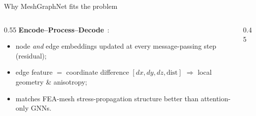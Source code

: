 \documentclass[aspectratio=169,10pt]{beamer}
\begin{document}
\begin{frame}{Why MeshGraphNet fits the problem}
\begin{columns}[T]
\begin{column}{0.55\textwidth}
\textbf{Encode--Process--Decode}~\cite{pfaff2021learning,sanchezgonzalez2020learning}:
\begin{itemize}
  \item node \emph{and} edge embeddings updated at every message-passing step (residual);
  \item edge feature $=$ coordinate difference $[dx,dy,dz,\text{dist}]$
        $\Rightarrow$ local geometry \& anisotropy;
  \item matches FEA-mesh stress-propagation structure better than attention-only GNNs.
\end{itemize}
\end{column}
\begin{column}{0.45\textwidth}
\centering
{}
\end{column}
\end{columns}
\end{frame}
\end{document}
